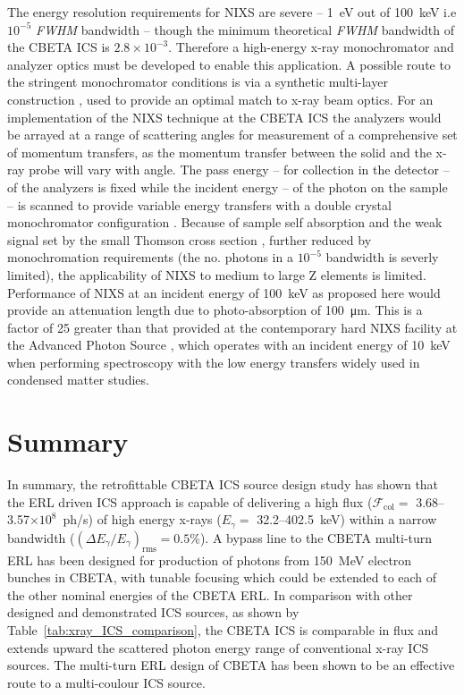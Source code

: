\documentclass[../main.tex]{subfiles}
\begin{document}
The energy resolution requirements for NIXS are severe -- 1~\si{\electronvolt} out of 100~\si{\kilo\electronvolt} i.e $10^{-5}$ \textit{FWHM} bandwidth -- though the minimum theoretical \textit{FWHM} bandwidth of the CBETA ICS is $2.8\times 10^{-3}$. Therefore a high-energy x-ray monochromator and analyzer optics must be developed to enable this application. A possible route to the stringent monochromator conditions is via a synthetic multi-layer construction \cite{andre2002x}, used to provide an optimal match to x-ray beam optics. For an implementation of the NIXS technique at the CBETA ICS the analyzers would be arrayed at a range of scattering angles for measurement of a comprehensive set of momentum transfers, as the momentum transfer between the solid and the x-ray probe will vary with angle. The pass energy -- for collection in the detector -- of the analyzers is fixed while the incident energy -- of the photon on the sample -- is scanned to provide variable energy transfers with a double crystal monochromator configuration \cite{schulke2007electron,fister2006multielement}. Because of sample self absorption and the weak signal set by the small Thomson cross section \cite{schulke2007electron}, further reduced by monochromation requirements (the no. photons in a $10^{-5}$ bandwidth is severly limited), the applicability of NIXS to medium to large Z elements is limited. Performance of NIXS at an incident energy of 100~\si{\kilo\electronvolt} as proposed here would provide an attenuation length due to photo-absorption of 100~\si{\micro\meter}. This is a factor of 25 greater \cite{TungstenGraph} than that provided at the contemporary hard NIXS facility at the Advanced Photon Source \cite{fister2006multielement}, which operates with an incident energy of 10~\si{\kilo\electronvolt} when performing spectroscopy with the low energy transfers widely used in condensed matter studies.  

\section{Summary}

In summary, the retrofittable CBETA ICS source design study has shown that the ERL driven ICS approach is capable of delivering a high flux ($\mathcal{F}_{\mathrm{col}} =$ 3.68--3.57$\times 10^{8}$~ph/\si{\second}) of high energy x-rays ($E_{\gamma} =$ 32.2--402.5~\si{\kilo\electronvolt}) within a narrow bandwidth ($\left(\Delta E_{\gamma}/E_{\gamma}\right)_{\mathrm{rms}} = 0.5$\%). A bypass line to the CBETA multi-turn ERL has been designed for production of photons from 150~\si{\mega\electronvolt} electron bunches in CBETA, with tunable focusing which could be extended to each of the other nominal energies of the CBETA ERL. In comparison with other designed and demonstrated ICS sources, as shown by Table~\ref{tab:xray_ICS_comparison}, the CBETA ICS is comparable in flux and extends upward the scattered photon energy range of conventional x-ray ICS sources. The multi-turn ERL design of CBETA has been shown to be an effective route to a multi-coulour ICS source. 
\end{document}
